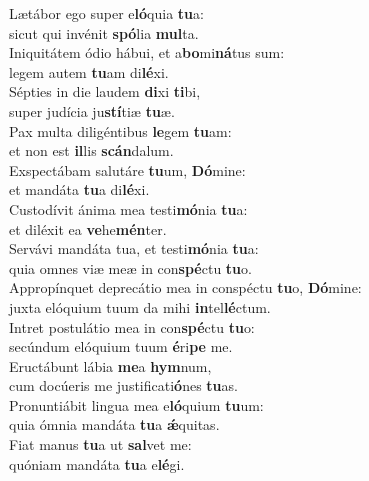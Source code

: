 \evenverse Lætábor ego super e\textbf{ló}quia \textbf{tu}a:~\*\\
\evenverse sicut qui invénit \textbf{spó}lia \textbf{mul}ta.\\
\oddverse Iniquitátem ódio hábui, et a\textbf{bo}mi\textbf{ná}tus sum:~\*\\
\oddverse legem autem \textbf{tu}am di\textbf{lé}xi.\\
\evenverse Sépties in die laudem \textbf{di}xi \textbf{ti}bi,~\*\\
\evenverse super judícia ju\textbf{stí}tiæ \textbf{tu}æ.\\
\oddverse Pax multa diligéntibus \textbf{le}gem \textbf{tu}am:~\*\\
\oddverse et non est \textbf{il}lis \textbf{scán}dalum.\\
\evenverse Exspectábam salutáre \textbf{tu}um, \textbf{Dó}mine:~\*\\
\evenverse et mandáta \textbf{tu}a di\textbf{lé}xi.\\
\oddverse Custodívit ánima mea testi\textbf{mó}nia \textbf{tu}a:~\*\\
\oddverse et diléxit ea \textbf{ve}he\textbf{mén}ter.\\
\evenverse Servávi mandáta tua, et testi\textbf{mó}nia \textbf{tu}a:~\*\\
\evenverse quia omnes viæ meæ in con\textbf{spé}ctu \textbf{tu}o.\\
\oddverse Appropínquet deprecátio mea in conspéctu \textbf{tu}o, \textbf{Dó}mine:~\*\\
\oddverse juxta elóquium tuum da mihi \textbf{in}tel\textbf{lé}ctum.\\
\evenverse Intret postulátio mea in con\textbf{spé}ctu \textbf{tu}o:~\*\\
\evenverse secúndum elóquium tuum \textbf{é}ri\textbf{pe} me.\\
\oddverse Eructábunt lábia \textbf{me}a \textbf{hym}num,~\*\\
\oddverse cum docúeris me justificati\textbf{ó}nes \textbf{tu}as.\\
\evenverse Pronuntiábit lingua mea e\textbf{ló}quium \textbf{tu}um:~\*\\
\evenverse quia ómnia mandáta \textbf{tu}a \textbf{ǽ}quitas.\\
\oddverse Fiat manus \textbf{tu}a ut \textbf{sal}vet me:~\*\\
\oddverse quóniam mandáta \textbf{tu}a e\textbf{lé}gi.\\
